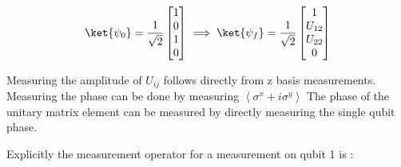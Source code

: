 \begin{equation}
    \ket{\psi_0}=\frac{1}{\sqrt{2}}
    \begin{bmatrix}
        1 \\
        0 \\
        1 \\
        0 \\
    \end{bmatrix}
    \implies
    \ket{\psi_{f}}=
    \frac{1}{\sqrt{2}}
    \begin{bmatrix}
        1 \\
        U_{12} \\
        U_{22} \\
        0 \\
    \end{bmatrix}
\end{equation}

Measuring the amplitude of $U_{ij}$ follows directly from z basis measurements.
Measuring the phase can be done by measuring $\left< \sigma^{x} + i\sigma^{y} \right>$
The phase of the unitary matrix element can be measured by directly measuring the single qubit phase.

Explicitly the measurement operator for a measurement on qubit 1 is :

